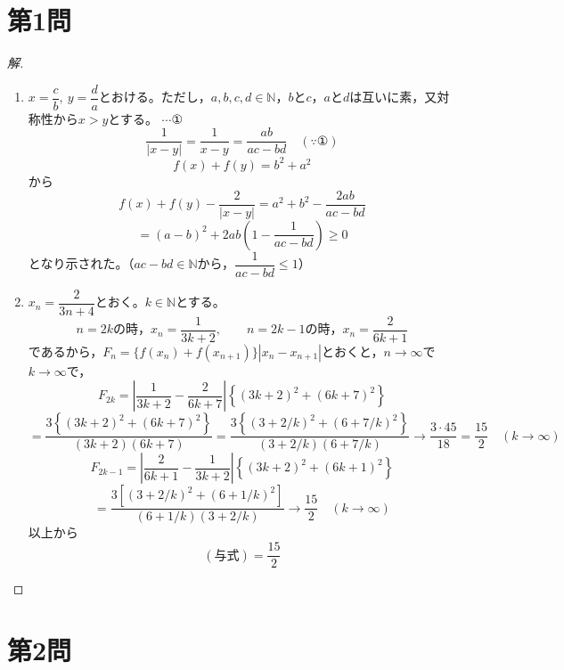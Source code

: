 \documentclass[../main.tex]{subfiles}
\begin{document}
\section*{第1問}

\begin{proof}[解]
  \begin{enumerate}
    \item[(1)] $x=\dfrac{c}{b},\ y=\dfrac{d}{a}$とおける。ただし，$a,b,c,d\in\mathbb{N}$，$b$と$c$，$a$と$d$は互いに素，又対称性から$x>y$とする。 $\cdots$①
      \[
        \frac{1}{|x-y|}=\frac{1}{x-y}=\frac{ab}{ac-bd} \quad(\because①)
      \]
      \[
        f(x)+f(y)=b^2+a^2
      \]
      から
      \[
        f(x)+f(y)-\frac{2}{|x-y|}=a^2+b^2-\frac{2ab}{ac-bd}
      \]
      \[
        =(a-b)^2+2ab\left(1-\frac{1}{ac-bd}\right)\ge0
      \]
      となり示された。（$ac-bd\in\mathbb{N}$から，$\dfrac{1}{ac-bd}\le1$）

    \item[(2)] $x_n=\dfrac{2}{3n+4}$とおく。$k\in\mathbb{N}$とする。
      \[
        n=2k\text{の時，}x_n=\frac{1}{3k+2}, \qquad n=2k-1\text{の時，}x_n=\frac{2}{6k+1}
      \]
      であるから，$F_n=\{f(x_n)+f(x_{n+1})\}|x_n-x_{n+1}|$とおくと，$n\to\infty$で$k\to\infty$で，
      \[
        F_{2k}=\left|\frac{1}{3k+2}-\frac{2}{6k+7}\right|\left\{(3k+2)^2+(6k+7)^2\right\}
      \]
      \[
        =\frac{3\left\{(3k+2)^2+(6k+7)^2\right\}}{(3k+2)(6k+7)}
        =\frac{3\left\{(3+2/k)^2+(6+7/k)^2\right\}}{(3+2/k)(6+7/k)}\longrightarrow\frac{3\cdot45}{18}=\frac{15}{2}\quad(k\to\infty)
      \]
      \[
        F_{2k-1}=\left|\frac{2}{6k+1}-\frac{1}{3k+2}\right|\left\{(3k+2)^2+(6k+1)^2\right\}
      \]
      \[
        =\frac{3\left[(3+2/k)^2+(6+1/k)^2\right]}{(6+1/k)(3+2/k)}\longrightarrow\frac{15}{2}\quad(k\to\infty)
      \]
      以上から
      \[
        (\text{与式})=\frac{15}{2}
      \]
  \end{enumerate}
\end{proof}

\newpage

\section*{第2問}
\end{document}
